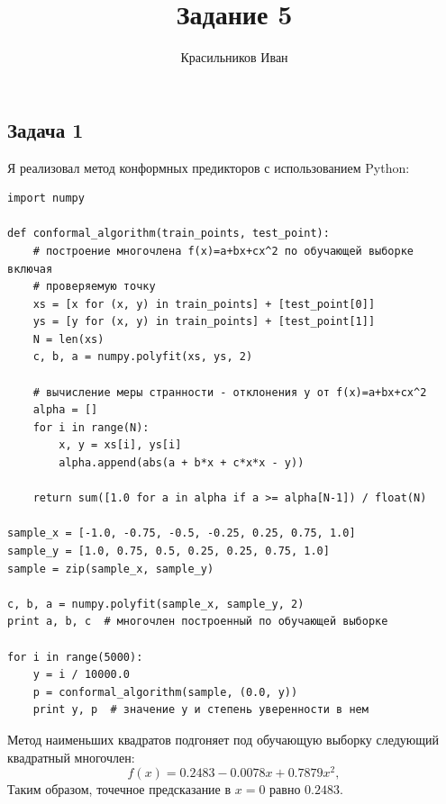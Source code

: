 \documentclass[a4paper, 12pt, onepage]{article}
\begin{document}
\author{Красильников Иван}
\title{Задание 5}
\maketitle

\subsection*{Задача 1}
Я реализовал метод конформных предикторов с использованием Python:
{
\footnotesize
\begin{verbatim}
import numpy

def conformal_algorithm(train_points, test_point):
    # построение многочлена f(x)=a+bx+cx^2 по обучающей выборке включая
    # проверяемую точку
    xs = [x for (x, y) in train_points] + [test_point[0]]
    ys = [y for (x, y) in train_points] + [test_point[1]]
    N = len(xs)
    c, b, a = numpy.polyfit(xs, ys, 2)

    # вычисление меры странности - отклонения y от f(x)=a+bx+cx^2
    alpha = []
    for i in range(N):
        x, y = xs[i], ys[i]
        alpha.append(abs(a + b*x + c*x*x - y))

    return sum([1.0 for a in alpha if a >= alpha[N-1]) / float(N)

sample_x = [-1.0, -0.75, -0.5, -0.25, 0.25, 0.75, 1.0]
sample_y = [1.0, 0.75, 0.5, 0.25, 0.25, 0.75, 1.0]
sample = zip(sample_x, sample_y)

c, b, a = numpy.polyfit(sample_x, sample_y, 2)
print a, b, c  # многочлен построенный по обучающей выборке

for i in range(5000):
    y = i / 10000.0
    p = conformal_algorithm(sample, (0.0, y))
    print y, p  # значение y и степень уверенности в нем
\end{verbatim}
}

Метод наименьших квадратов подгоняет под обучающую выборку следующий квадратный многочлен:
$$ f(x) = 0.2483 - 0.0078x + 0.7879x^2, $$
Таким образом, точечное предсказание в $x=0$ равно $0.2483$.
\end{document}
